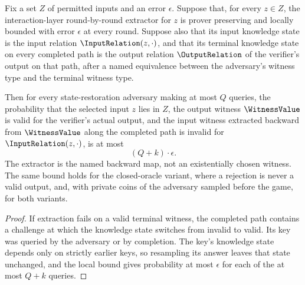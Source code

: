 \begin{theorem}
    \label{thm:sr_knowledge_soundness}
    Fix a set \(Z\) of permitted inputs and an error \(\epsilon\). Suppose that, for every \(z \in Z\),
    the interaction-layer round-by-round extractor for \(z\) is prover preserving and locally bounded with error
    \(\epsilon\) at every round. Suppose also that its input knowledge state is the input relation
    \(\InputRelation(z, \cdot)\), and that its terminal knowledge state on every completed path is
    the output relation \(\OutputRelation\) of the verifier's output on that path, after a named
    equivalence between the adversary's witness type and the terminal witness type.

    Then for every state-restoration adversary making at most \(Q\) queries, the probability that
    the selected input \(z\) lies in \(Z\), the output witness \(\WitnessValue\) is valid for the verifier's actual
    output, and the input witness extracted backward from \(\WitnessValue\) along the completed path is invalid
    for \(\InputRelation(z, \cdot)\), is at most
    \begin{equation*}
        (Q + k) \cdot \epsilon .
    \end{equation*}
    The extractor is the named backward map, not an existentially chosen witness. The same bound
    holds for the closed-oracle variant, where a rejection is never a valid output, and, with
    private coins of the adversary sampled before the game, for both variants.
    \leanok
\end{theorem}
\begin{proof}
    \leanok
    If extraction fails on a valid terminal witness, the completed path contains a challenge at
    which the knowledge state switches from invalid to valid. Its key was queried by the adversary
    or by completion. The key's knowledge state depends only on strictly earlier keys, so
    resampling its answer leaves that state unchanged, and the local bound gives probability at
    most \(\epsilon\) for each of the at most \(Q + k\) queries.
\end{proof}

